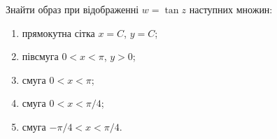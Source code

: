 \begin{solution}

\end{solution}

\begin{problem}[Волковиський, 2.154]
    Знайти образ при відображенні $w = \tan z$ наступних множин:
    \begin{enumerate}
        \item прямокутна сітка $x = C$, $y = C$;
        \item півсмуга $0 < x < \pi$, $y > 0$;
        \item смуга $0 < x < \pi$;
        \item смуга $0 < x < \pi / 4$;
        \item смуга $- \pi / 4 < x < \pi / 4$.
    \end{enumerate}
\end{problem}

\begin{solution}

\end{solution}